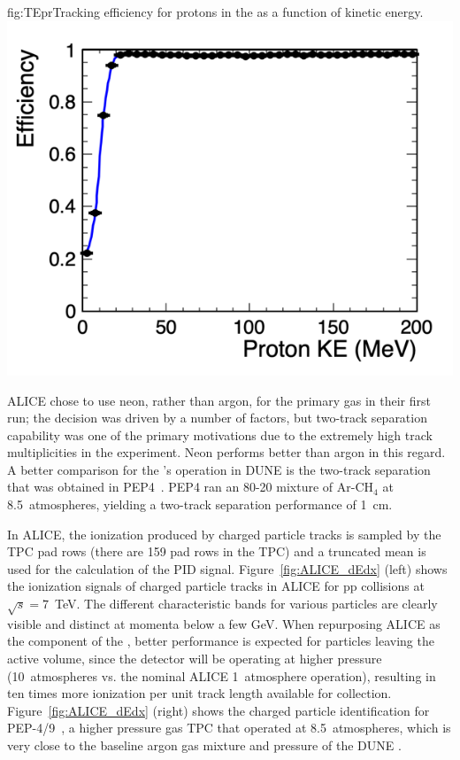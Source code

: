 \begin{dunefigure}{fig:TEpr}{Tracking efficiency for protons in the  as a function of kinetic energy.} 
\includegraphics[width=0.65\columnwidth]{graphics/effvske.png} 
\end{dunefigure}

ALICE chose to use neon, rather than argon, for the primary gas in their first run; the decision was driven by a number of factors, but two-track separation capability was one of the primary motivations due to the extremely high track multiplicities in the experiment.  Neon performs better than argon in this regard.  A better comparison for the 's operation in DUNE is the two-track separation that was obtained in PEP4~\cite{PEP4_Stork}.  PEP4 ran an 80-20 mixture of Ar-CH$_4$ at 8.5~atmospheres, yielding a two-track separation performance of \SI{1}{cm}.

In ALICE, the ionization produced by charged particle tracks is sampled by the TPC pad rows (there are 159 pad rows in the TPC) and a truncated mean is used for the calculation of the PID signal. Figure~\ref{fig:ALICE_dEdx} (left) shows the ionization signals of charged particle tracks in ALICE for pp collisions at $\sqrt{s} = 7$~TeV. The different characteristic bands for various particles are clearly visible and distinct at momenta below a few GeV.  When repurposing ALICE as the  component of the ,  better performance is expected for particles leaving the active volume, since the detector will be operating at higher pressure (10~atmospheres vs. the nominal ALICE 1~atmosphere operation), resulting in ten times more ionization per unit track length available for collection. Figure~\ref{fig:ALICE_dEdx} (right) shows the charged particle identification for PEP-4/9~\cite{Grupen:1999by}, a higher pressure gas TPC that operated at 8.5~atmospheres, which is very close to the baseline argon gas mixture and pressure of the DUNE .

